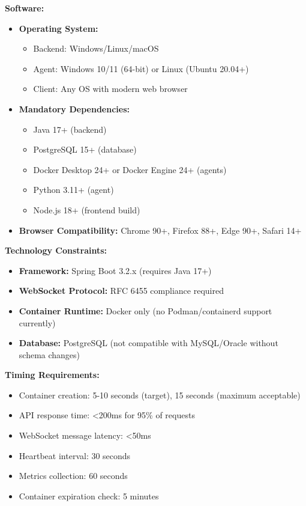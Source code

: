 \documentclass[12pt,a4paper]{article}
\begin{document}
\textbf{Software:}

\begin{itemize}[noitemsep]
    \item \textbf{Operating System:}
    \begin{itemize}[noitemsep]
        \item Backend: Windows/Linux/macOS
        \item Agent: Windows 10/11 (64-bit) or Linux (Ubuntu 20.04+)
        \item Client: Any OS with modern web browser
    \end{itemize}
    \item \textbf{Mandatory Dependencies:}
    \begin{itemize}[noitemsep]
        \item Java 17+ (backend)
        \item PostgreSQL 15+ (database)
        \item Docker Desktop 24+ or Docker Engine 24+ (agents)
        \item Python 3.11+ (agent)
        \item Node.js 18+ (frontend build)
    \end{itemize}
    \item \textbf{Browser Compatibility:} Chrome 90+, Firefox 88+, Edge 90+, Safari 14+
\end{itemize}

\textbf{Technology Constraints:}

\begin{itemize}[noitemsep]
    \item \textbf{Framework:} Spring Boot 3.2.x (requires Java 17+)
    \item \textbf{WebSocket Protocol:} RFC 6455 compliance required
    \item \textbf{Container Runtime:} Docker only (no Podman/containerd support currently)
    \item \textbf{Database:} PostgreSQL (not compatible with MySQL/Oracle without schema changes)
\end{itemize}

\textbf{Timing Requirements:}

\begin{itemize}[noitemsep]
    \item Container creation: 5-10 seconds (target), 15 seconds (maximum acceptable)
    \item API response time: <200ms for 95\% of requests
    \item WebSocket message latency: <50ms
    \item Heartbeat interval: 30 seconds
    \item Metrics collection: 60 seconds
    \item Container expiration check: 5 minutes
\end{itemize}
\end{document}
